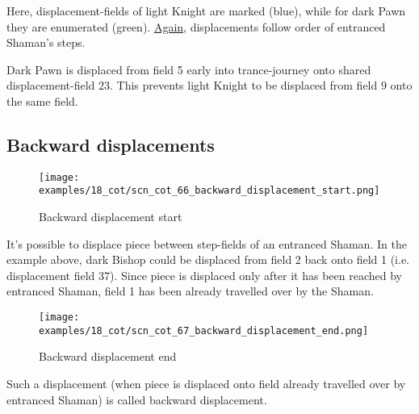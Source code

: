 Here, displacement-fields of light Knight are marked (blue), while for dark Pawn
they are enumerated (green).
\hyperref[fig:scn_cot_57_light_light_shaman_interaction_end]{Again}, displacements
follow order of entranced Shaman's steps.

Dark Pawn is displaced from field 5 early into trance-journey onto shared
displacement-field 23. This prevents light Knight to be displaced from field 9
onto the same field.

\clearpage %

\subsection*{Backward displacements}
\label{sec:Conquest of Tlalocan/Trance-journey/Backward displacements}

\noindent
\begin{figure}[!h]
\vspace{-1.0\baselineskip}
\texttt{[image: examples/18\_cot/scn\_cot\_66\_backward\_displacement\_start.png]}
\caption{Backward displacement start}
\label{fig:scn_cot_66_backward_displacement_start}
\end{figure}

It's possible to displace piece between step-fields of an entranced Shaman. In the
example above, dark Bishop could be displaced from field 2 back onto field 1 (i.e.
displacement field 37). Since piece is displaced only after it has been reached by
entranced Shaman, field 1 has been already travelled over by the Shaman.

\clearpage %

\noindent
\begin{figure}[!h]
\texttt{[image: examples/18\_cot/scn\_cot\_67\_backward\_displacement\_end.png]}
\caption{Backward displacement end}
\label{fig:scn_cot_67_backward_displacement_end}
\end{figure}

Such a displacement (when piece is displaced onto field already travelled over
by entranced Shaman) is called backward displacement.

